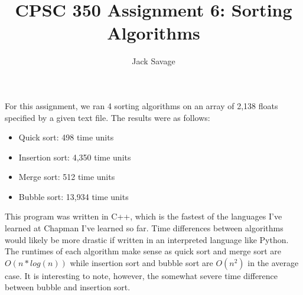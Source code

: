 \documentclass[12pt]{article}
\title{CPSC 350 Assignment 6: Sorting Algorithms}
\author{Jack Savage}
\begin{document}
\maketitle

For this assignment, we ran 4 sorting algorithms on an array of 2,138 floats specified
by a given text file. The results were as follows:
\begin{itemize}
\item Quick sort: 498 time units
\item Insertion sort: 4,350 time units
\item Merge sort: 512 time units
\item Bubble sort: 13,934 time units

\end{itemize}

This program was written in C++, which is the fastest of the languages I've learned at Chapman
I've learned so far. Time differences between algorithms would likely be more drastic if written in an interpreted language like Python. The runtimes of each algorithm make sense as quick sort and merge sort are $O(n*log (n))$ while insertion sort and bubble sort are $O(n^2)$ in the average case. It is interesting to note, however, the somewhat severe time difference between bubble and insertion sort. 
\end{document}
